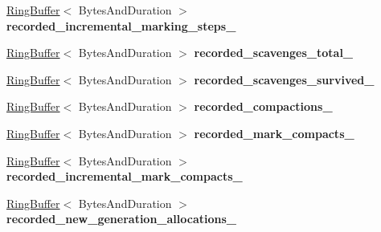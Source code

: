 \begin{DoxyCompactItemize}
\item 
\hyperlink{classv8_1_1internal_1_1_ring_buffer}{Ring\+Buffer}$<$ Bytes\+And\+Duration $>$ {\bfseries recorded\+\_\+incremental\+\_\+marking\+\_\+steps\+\_\+}\hypertarget{classv8_1_1internal_1_1_g_c_tracer_a57d46a13a3f86d04d8921bb09edc578c}{}\label{classv8_1_1internal_1_1_g_c_tracer_a57d46a13a3f86d04d8921bb09edc578c}

\item 
\hyperlink{classv8_1_1internal_1_1_ring_buffer}{Ring\+Buffer}$<$ Bytes\+And\+Duration $>$ {\bfseries recorded\+\_\+scavenges\+\_\+total\+\_\+}\hypertarget{classv8_1_1internal_1_1_g_c_tracer_a4a821b676db9bca579e41130cb829042}{}\label{classv8_1_1internal_1_1_g_c_tracer_a4a821b676db9bca579e41130cb829042}

\item 
\hyperlink{classv8_1_1internal_1_1_ring_buffer}{Ring\+Buffer}$<$ Bytes\+And\+Duration $>$ {\bfseries recorded\+\_\+scavenges\+\_\+survived\+\_\+}\hypertarget{classv8_1_1internal_1_1_g_c_tracer_a7c71a79237a9ce852d1980725b7f10e8}{}\label{classv8_1_1internal_1_1_g_c_tracer_a7c71a79237a9ce852d1980725b7f10e8}

\item 
\hyperlink{classv8_1_1internal_1_1_ring_buffer}{Ring\+Buffer}$<$ Bytes\+And\+Duration $>$ {\bfseries recorded\+\_\+compactions\+\_\+}\hypertarget{classv8_1_1internal_1_1_g_c_tracer_a8ef8ba5aa99b94f894f0b537895bc614}{}\label{classv8_1_1internal_1_1_g_c_tracer_a8ef8ba5aa99b94f894f0b537895bc614}

\item 
\hyperlink{classv8_1_1internal_1_1_ring_buffer}{Ring\+Buffer}$<$ Bytes\+And\+Duration $>$ {\bfseries recorded\+\_\+mark\+\_\+compacts\+\_\+}\hypertarget{classv8_1_1internal_1_1_g_c_tracer_a888327afca6b50ff3dcee118b188eaea}{}\label{classv8_1_1internal_1_1_g_c_tracer_a888327afca6b50ff3dcee118b188eaea}

\item 
\hyperlink{classv8_1_1internal_1_1_ring_buffer}{Ring\+Buffer}$<$ Bytes\+And\+Duration $>$ {\bfseries recorded\+\_\+incremental\+\_\+mark\+\_\+compacts\+\_\+}\hypertarget{classv8_1_1internal_1_1_g_c_tracer_a36170263384ea2c6da6d26dc9dadf46d}{}\label{classv8_1_1internal_1_1_g_c_tracer_a36170263384ea2c6da6d26dc9dadf46d}

\item 
\hyperlink{classv8_1_1internal_1_1_ring_buffer}{Ring\+Buffer}$<$ Bytes\+And\+Duration $>$ {\bfseries recorded\+\_\+new\+\_\+generation\+\_\+allocations\+\_\+}\hypertarget{classv8_1_1internal_1_1_g_c_tracer_a18d10e051ff425c95c13c5ba92d85314}{}\label{classv8_1_1internal_1_1_g_c_tracer_a18d10e051ff425c95c13c5ba92d85314}


\end{DoxyCompactItemize}
